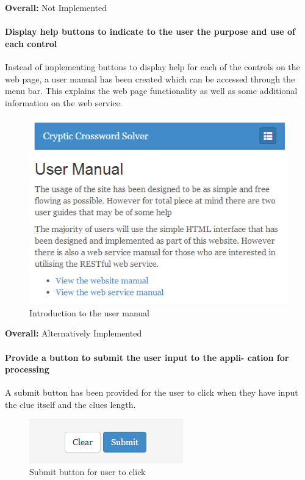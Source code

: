 {\bf Overall:} Not Implemented

\paragraph{Display help buttons to indicate to the user the purpose
and use of each control}

Instead of implementing buttons to display help for each of the controls on the web page, 
a user manual has been created which can be accessed through the menu bar. This explains 
the web page functionality as well as some additional information on the web service. 

\begin{figure}[H]
	\centering
	\includegraphics[keepaspectratio=true]{evidence/manual.png}
	\caption{Introduction to the user manual}
\end{figure}

{\bf Overall:} Alternatively Implemented

\paragraph{Provide a button to submit the user input to the appli-
cation for processing}

A submit button has been provided for the user to click when they have input 
the clue itself and the clues length. 

\begin{figure}[H]
	\centering
	\includegraphics[keepaspectratio=true]{evidence/submit.png}
	\caption{Submit button for user to click}
\end{figure}

